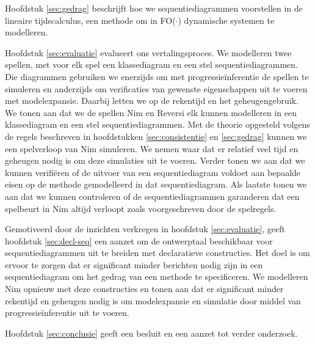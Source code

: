 \sloppy Hoofdstuk \ref{sec:gedrag} beschrijft hoe we sequentiediagrammen voorstellen in de lineaire tijdscalculus\cite{BogaertsBart2014Sdsu}, een methode om in FO($\cdot$) dynamische systemen te modelleren.

Hoofdstuk \ref{sec:evaluatie} evalueert ons vertalingsproces. We modelleren twee spellen, met voor elk spel een klassediagram en een stel sequentiediagrammen. Die diagrammen gebruiken we enerzijds om met progressie\"inferentie de spellen te simuleren en anderzijds om verificaties van gewenste eigenschappen uit te voeren met modelexpansie. Daarbij letten we op de rekentijd en het geheugengebruik. We tonen aan dat we de spellen Nim en Reversi elk kunnen modelleren in een klassediagram en een stel sequentiediagrammen. Met de theorie opgesteld volgens de regels beschreven in hoofdstukken \ref{sec:consistentie} en \ref{sec:gedrag} kunnen we een spelverloop van Nim simuleren. We nemen waar dat er relatief veel tijd en geheugen nodig is om deze simulaties uit te voeren. Verder tonen we aan dat we kunnen verifi\"eren of de uitvoer van een sequentiediagram voldoet aan bepaalde eisen op de methode gemodelleerd in dat sequentiediagram. Als laatste tonen we aan dat we kunnen controleren of de sequentiediagrammen garanderen dat een spelbeurt in Nim altijd verloopt zoals voorgeschreven door de spelregels.

Gemotiveerd door de inzichten verkregen in hoofdstuk \ref{sec:evaluatie}, geeft hoofdstuk \ref{sec:decl-seq} een aanzet om de ontwerptaal beschikbaar voor sequentiediagrammen uit te breiden met declaratieve constructies. Het doel is om ervoor te zorgen dat er significant minder berichten nodig zijn in een sequentiediagram om het gedrag van een methode te specificeren. We modelleren Nim opnieuw met deze constructies en tonen aan dat er significant minder rekentijd en geheugen nodig is om modelexpansie en simulatie door middel van progressie\"inferentie uit te voeren.

Hoofdstuk \ref{sec:conclusie} geeft een besluit en een aanzet tot verder onderzoek.